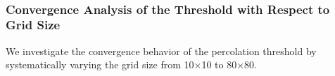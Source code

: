 \documentclass[11pt]{article}
\begin{document}
    \begin{center}
    \end{center}
    { \hspace*{\fill} \\}
    
    \subsubsection{Convergence Analysis of the Threshold with Respect to
Grid
Size}\label{convergence-analysis-of-the-threshold-with-respect-to-grid-size}

We investigate the convergence behavior of the percolation threshold by
systematically varying the grid size from 10×10 to 80×80.
\end{document}
